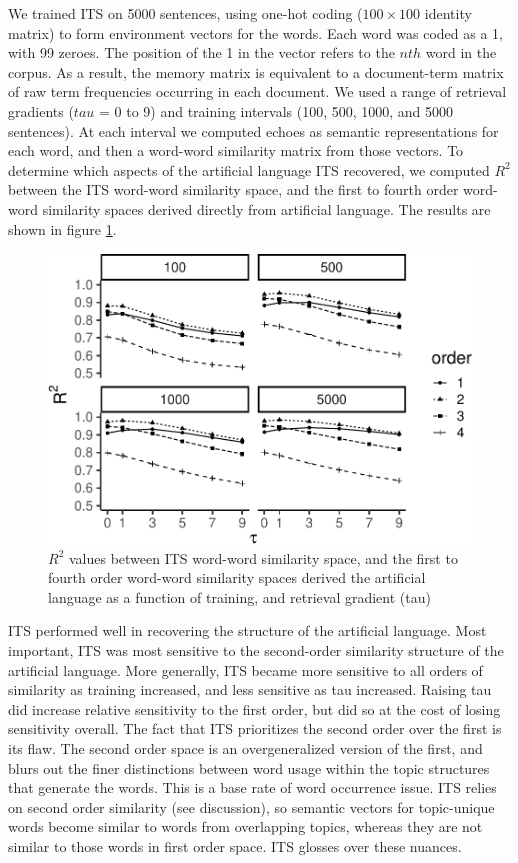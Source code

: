 \documentclass[10pt,letterpaper]{article}
\begin{document}
We trained ITS on 5000 sentences, using one-hot coding ($100 \times 100$ identity matrix) to form environment vectors for the words. Each word was coded as a 1, with 99 zeroes. The position of the 1 in the vector refers to the \(nth\) word in the corpus. As a result, the memory matrix is equivalent to a document-term matrix of raw term frequencies occurring in each document. We used a range of retrieval gradients ($tau$ = 0 to 9) and training intervals (100, 500, 1000, and 5000 sentences). At each interval we computed echoes as semantic representations for each word, and then a word-word similarity matrix from those vectors. To determine which aspects of the artificial language ITS recovered, we computed \(R^2\) between the ITS word-word similarity space, and the first to fourth order word-word similarity spaces derived directly from artificial language. The results are shown in figure \ref{fig:ITSsimple}.

\begin{figure}
\centering
\includegraphics[width=\linewidth]{ITS_cogsci_files/figure-latex/ITSsimple-1.pdf}
\caption{\label{fig:ITSsimple}\(R^2\) values between ITS word-word similarity space, and the first to fourth order word-word similarity spaces derived the artificial language as a function of training, and retrieval gradient (tau)}
\end{figure}

ITS performed well in recovering the structure of the artificial language. Most important, ITS was most sensitive to the second-order similarity structure of the artificial language. More generally, ITS became more sensitive to all orders of similarity as training increased, and less sensitive as tau increased. Raising tau did increase relative sensitivity to the first order, but did so at the cost of losing sensitivity overall. The fact that ITS prioritizes the second order over the first is its flaw. The second order space is an overgeneralized version of the first, and blurs out the finer distinctions between word usage within the topic structures that generate the words. This is a base rate of word occurrence issue. ITS relies on second order similarity (see discussion), so semantic vectors for topic-unique words become similar to words from overlapping topics, whereas they are not similar to those words in first order space. ITS glosses over these nuances.
\end{document}
